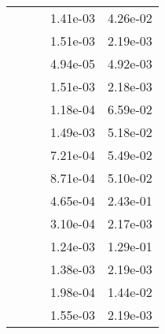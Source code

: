 \begin{table}
\begin{tabular}{c|cc|cc|}
\multicolumn{1}{|c|}{} & \multicolumn{1}{|c|}{} & \multicolumn{1}{|c|}{} & \multicolumn{1}{|c|}{  1.41e-03} & \multicolumn{1}{|c|}{  4.26e-02} \\ 
\multicolumn{1}{|c|}{} & \multicolumn{1}{|c|}{} & \multicolumn{1}{|c|}{} & \multicolumn{1}{|c|}{  1.51e-03} & \multicolumn{1}{|c|}{  2.19e-03} \\ 
\multicolumn{1}{|c|}{} & \multicolumn{1}{|c|}{} & \multicolumn{1}{|c|}{} & \multicolumn{1}{|c|}{  4.94e-05} & \multicolumn{1}{|c|}{  4.92e-03} \\ 
\multicolumn{1}{|c|}{} & \multicolumn{1}{|c|}{} & \multicolumn{1}{|c|}{} & \multicolumn{1}{|c|}{  1.51e-03} & \multicolumn{1}{|c|}{  2.18e-03} \\ 
\multicolumn{1}{|c|}{} & \multicolumn{1}{|c|}{} & \multicolumn{1}{|c|}{} & \multicolumn{1}{|c|}{  1.18e-04} & \multicolumn{1}{|c|}{  6.59e-02} \\ 
\multicolumn{1}{|c|}{} & \multicolumn{1}{|c|}{} & \multicolumn{1}{|c|}{} & \multicolumn{1}{|c|}{  1.49e-03} & \multicolumn{1}{|c|}{  5.18e-02} \\ 
\multicolumn{1}{|c|}{} & \multicolumn{1}{|c|}{} & \multicolumn{1}{|c|}{} & \multicolumn{1}{|c|}{  7.21e-04} & \multicolumn{1}{|c|}{  5.49e-02} \\ 
\multicolumn{1}{|c|}{} & \multicolumn{1}{|c|}{} & \multicolumn{1}{|c|}{} & \multicolumn{1}{|c|}{  8.71e-04} & \multicolumn{1}{|c|}{  5.10e-02} \\ 
\multicolumn{1}{|c|}{} & \multicolumn{1}{|c|}{} & \multicolumn{1}{|c|}{} & \multicolumn{1}{|c|}{  4.65e-04} & \multicolumn{1}{|c|}{  2.43e-01} \\ 
\multicolumn{1}{|c|}{} & \multicolumn{1}{|c|}{} & \multicolumn{1}{|c|}{} & \multicolumn{1}{|c|}{  3.10e-04} & \multicolumn{1}{|c|}{  2.17e-03} \\ 
\multicolumn{1}{|c|}{} & \multicolumn{1}{|c|}{} & \multicolumn{1}{|c|}{} & \multicolumn{1}{|c|}{  1.24e-03} & \multicolumn{1}{|c|}{  1.29e-01} \\ 
\multicolumn{1}{|c|}{} & \multicolumn{1}{|c|}{} & \multicolumn{1}{|c|}{} & \multicolumn{1}{|c|}{  1.38e-03} & \multicolumn{1}{|c|}{  2.19e-03} \\ 
\multicolumn{1}{|c|}{} & \multicolumn{1}{|c|}{} & \multicolumn{1}{|c|}{} & \multicolumn{1}{|c|}{  1.98e-04} & \multicolumn{1}{|c|}{  1.44e-02} \\ 
\multicolumn{1}{|c|}{} & \multicolumn{1}{|c|}{} & \multicolumn{1}{|c|}{} & \multicolumn{1}{|c|}{  1.55e-03} & \multicolumn{1}{|c|}{  2.19e-03} \\ 

\end{tabular}
\end{table}
